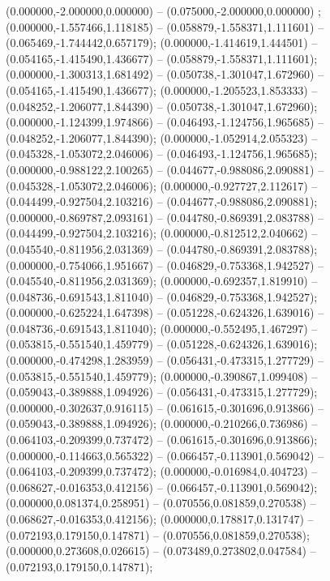  (0.000000,-2.000000,0.000000) -- (0.075000,-2.000000,0.000000) ;
 (0.000000,-1.557466,1.118185) -- (0.058879,-1.558371,1.111601) -- (0.065469,-1.744442,0.657179);
 (0.000000,-1.414619,1.444501) -- (0.054165,-1.415490,1.436677) -- (0.058879,-1.558371,1.111601);
 (0.000000,-1.300313,1.681492) -- (0.050738,-1.301047,1.672960) -- (0.054165,-1.415490,1.436677);
 (0.000000,-1.205523,1.853333) -- (0.048252,-1.206077,1.844390) -- (0.050738,-1.301047,1.672960);
 (0.000000,-1.124399,1.974866) -- (0.046493,-1.124756,1.965685) -- (0.048252,-1.206077,1.844390);
 (0.000000,-1.052914,2.055323) -- (0.045328,-1.053072,2.046006) -- (0.046493,-1.124756,1.965685);
 (0.000000,-0.988122,2.100265) -- (0.044677,-0.988086,2.090881) -- (0.045328,-1.053072,2.046006);
 (0.000000,-0.927727,2.112617) -- (0.044499,-0.927504,2.103216) -- (0.044677,-0.988086,2.090881);
 (0.000000,-0.869787,2.093161) -- (0.044780,-0.869391,2.083788) -- (0.044499,-0.927504,2.103216);
 (0.000000,-0.812512,2.040662) -- (0.045540,-0.811956,2.031369) -- (0.044780,-0.869391,2.083788);
 (0.000000,-0.754066,1.951667) -- (0.046829,-0.753368,1.942527) -- (0.045540,-0.811956,2.031369);
 (0.000000,-0.692357,1.819910) -- (0.048736,-0.691543,1.811040) -- (0.046829,-0.753368,1.942527);
 (0.000000,-0.625224,1.647398) -- (0.051228,-0.624326,1.639016) -- (0.048736,-0.691543,1.811040);
 (0.000000,-0.552495,1.467297) -- (0.053815,-0.551540,1.459779) -- (0.051228,-0.624326,1.639016);
 (0.000000,-0.474298,1.283959) -- (0.056431,-0.473315,1.277729) -- (0.053815,-0.551540,1.459779);
 (0.000000,-0.390867,1.099408) -- (0.059043,-0.389888,1.094926) -- (0.056431,-0.473315,1.277729);
 (0.000000,-0.302637,0.916115) -- (0.061615,-0.301696,0.913866) -- (0.059043,-0.389888,1.094926);
 (0.000000,-0.210266,0.736986) -- (0.064103,-0.209399,0.737472) -- (0.061615,-0.301696,0.913866);
 (0.000000,-0.114663,0.565322) -- (0.066457,-0.113901,0.569042) -- (0.064103,-0.209399,0.737472);
 (0.000000,-0.016984,0.404723) -- (0.068627,-0.016353,0.412156) -- (0.066457,-0.113901,0.569042);
 (0.000000,0.081374,0.258951) -- (0.070556,0.081859,0.270538) -- (0.068627,-0.016353,0.412156);
 (0.000000,0.178817,0.131747) -- (0.072193,0.179150,0.147871) -- (0.070556,0.081859,0.270538);
 (0.000000,0.273608,0.026615) -- (0.073489,0.273802,0.047584) -- (0.072193,0.179150,0.147871);
